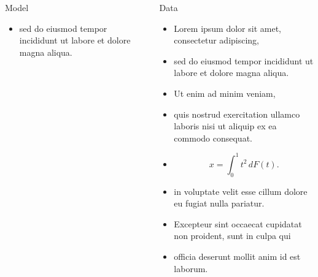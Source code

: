 \documentclass[12pt, final]{beamer}
\newlength{\sepwid}
\newlength{\onecolwid}
\newlength{\twocolwid}
\begin{document}
\begin{frame}[t]
\begin{columns}[t]
\begin{column}{\onecolwid}
\begin{block}{Model}
\begin{itemize}
          \item sed do eiusmod tempor incididunt ut labore et dolore magna aliqua.
        \end{itemize}
      \end{block}
    \end{column}
    \begin{column}{\sepwid}\end{column}
    \begin{column}{\twocolwid}
      \begin{block}{Data}
        \begin{itemize}
          \item Lorem ipsum \alert{dolor} sit amet, consectetur adipiscing,
          \item sed do eiusmod tempor incididunt ut labore et dolore magna aliqua.
          \item Ut enim ad minim veniam,
          \item quis nostrud exercitation ullamco laboris nisi ut aliquip ex ea commodo consequat.
          \item $$x = \int_0^1 t^2 \,dF(t).$$
          \item in voluptate velit \alert{esse cillum dolore} eu fugiat nulla pariatur.
          \item Excepteur sint occaecat cupidatat non proident, sunt in culpa qui
          \item officia deserunt mollit anim id est laborum.
        \end{itemize}
      \end{block}


\end{column}
\end{columns}
\end{frame}
\end{document}
